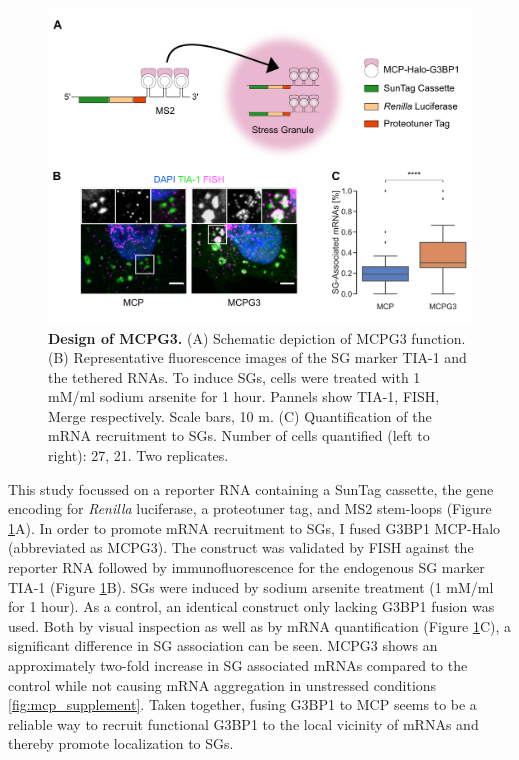 \begin{figure}[b!]
    \centering
    \includegraphics[width=\linewidth]{images/figure2}
    \caption{\textbf{Design of MCPG3.}
        (A) Schematic depiction of MCPG3 function.
        (B) Representative fluorescence images of the SG marker
            TIA-1 and the tethered RNAs.
            To induce SGs, cells were treated with 1 mM/ml sodium arsenite for 1 hour.
            Pannels show TIA-1, FISH, Merge respectively.
            Scale bars, 10 \textmu m.
        (C) Quantification of the mRNA recruitment to SGs.
            Number of cells quantified (left to right): 27, 21. Two replicates.
    }
    \label{fig:mcp_images}
\end{figure}

This study focussed on a reporter RNA containing a SunTag cassette, the gene encoding for \textit{Renilla} luciferase, a proteotuner tag, and MS2 stem-loops (Figure \ref{fig:mcp_images}A).
In order to promote mRNA recruitment to SGs, I fused G3BP1 MCP-Halo (abbreviated as MCPG3).
The construct was validated by FISH against the reporter RNA followed by immunofluorescence for the endogenous SG marker TIA-1 \cite{kedersha_rna-binding_1999} (Figure \ref{fig:mcp_images}B).
SGs were induced by sodium arsenite treatment (1 mM/ml for 1 hour).
As a control, an identical construct only lacking G3BP1 fusion was used.
Both by visual inspection as well as by mRNA quantification (Figure \ref{fig:mcp_images}C), a significant difference in SG association can be seen.
MCPG3 shows an approximately two-fold increase in SG associated mRNAs compared to the control while not causing mRNA aggregation in unstressed conditions \ref{fig:mcp_supplement}.
Taken together, fusing G3BP1 to MCP seems to be a reliable way to recruit functional G3BP1 to the local vicinity of mRNAs and thereby promote localization to SGs.


